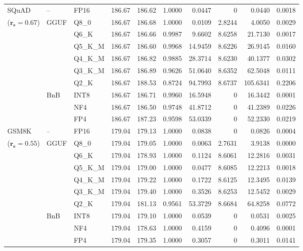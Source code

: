 \begin{longtable}{ll l rrrrrrr}
\midrule
SQuAD & -- & FP16 & 186.67 & 186.62 & 1.0000 & 0.0447 & \cellcolor{cyan!12} $0$ & 0.0440 & 0.0018 \\
{\small ($\mathbf{r_s{=}0.67}$)} & GGUF & Q8\_0 & 186.67 & 186.68 & 1.0000 & 0.0109 & 2.8244 & 4.0050 & 0.0029 \\
 &  & Q6\_K & 186.67 & 186.66 & 0.9987 & 9.6602 & 8.6258 & 21.7130 & 0.0017 \\
 &  & Q5\_K\_M & 186.67 & 186.60 & 0.9968 & 14.9459 & 8.6226 & 26.9145 & 0.0160 \\
 &  & Q4\_K\_M & 186.67 & 186.82 & 0.9885 & 28.3714 & 8.6230 & 40.1377 & 0.0302 \\
 &  & Q3\_K\_M & 186.67 & 186.89 & 0.9626 & 51.0640 & 8.6352 & 62.5048 & 0.0111 \\
 &  & Q2\_K & 186.67 & 188.53 & \cellcolor{red!18} 0.8724 & \cellcolor{red!18} 94.7993 & 8.6737 & \cellcolor{red!18} 105.6341 & \cellcolor{red!18} 0.2206 \\
 & BnB & INT8 & 186.67 & 186.71 & 0.9960 & 16.5948 & \cellcolor{cyan!12} $0$ & 16.3442 & 0.0001 \\
 &  & NF4 & 186.67 & 186.50 & 0.9748 & 41.8712 & \cellcolor{cyan!12} $0$ & 41.2389 & 0.0226 \\
 &  & FP4 & 186.67 & 187.23 & 0.9598 & 53.0339 & \cellcolor{cyan!12} $0$ & 52.2330 & 0.0219 \\
\midrule
GSM8K & -- & FP16 & 179.04 & 179.13 & 1.0000 & 0.0838 & \cellcolor{cyan!12} $0$ & 0.0826 & 0.0004 \\
{\small ($\mathbf{r_s{=}0.55}$)} & GGUF & Q8\_0 & 179.04 & 179.05 & 1.0000 & 0.0063 & 2.7631 & 3.9138 & 0.0000 \\
 &  & Q6\_K & 179.04 & 178.93 & 1.0000 & 0.1124 & 8.6061 & 12.2816 & 0.0031 \\
 &  & Q5\_K\_M & 179.04 & 179.00 & 1.0000 & 0.0477 & 8.6085 & 12.2213 & 0.0018 \\
 &  & Q4\_K\_M & 179.04 & 179.22 & 1.0000 & 0.1722 & 8.6125 & 12.3495 & 0.0139 \\
 &  & Q3\_K\_M & 179.04 & 179.40 & 1.0000 & 0.3526 & 8.6253 & 12.5452 & 0.0029 \\
 &  & Q2\_K & 179.04 & 181.13 & 0.9561 & 53.3729 & 8.6684 & 64.8258 & 0.0772 \\
 & BnB & INT8 & 179.04 & 179.10 & 1.0000 & 0.0539 & \cellcolor{cyan!12} $0$ & 0.0531 & 0.0025 \\
 &  & NF4 & 179.04 & 178.63 & 1.0000 & 0.4159 & \cellcolor{cyan!12} $0$ & 0.4096 & 0.0001 \\
 &  & FP4 & 179.04 & 179.35 & 1.0000 & 0.3057 & \cellcolor{cyan!12} $0$ & 0.3011 & 0.0141 \\

\end{longtable}
